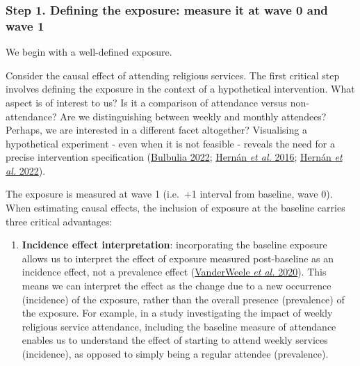 \documentclass[
  singlecolumn]{article}
\providecommand{\tightlist}{%
  \setlength{\itemsep}{0pt}\setlength{\parskip}{0pt}}\usepackage{longtable,booktabs,array}
\begin{document}
\subsubsection{Step 1. Defining the exposure: measure it at wave 0 and
wave
1}\label{step-1.-defining-the-exposure-measure-it-at-wave-0-and-wave-1}

We begin with a well-defined exposure.

Consider the causal effect of attending religious services. The first
critical step involves defining the exposure in the context of a
hypothetical intervention. What aspect is of interest to us? Is it a
comparison of attendance versus non-attendance? Are we distinguishing
between weekly and monthly attendees? Perhaps, we are interested in a
different facet altogether? Visualising a hypothetical experiment - even
when it is not feasible - reveals the need for a precise intervention
specification (\hyperref[ref-bulbulia2022]{Bulbulia 2022};
\hyperref[ref-hernuxe1n2016a]{Hernán \emph{et al.} 2016};
\hyperref[ref-hernuxe1n2022]{Hernán \emph{et al.} 2022}).

The exposure is measured at wave 1 (i.e.~+1 interval from baseline, wave
0). When estimating causal effects, the inclusion of exposure at the
baseline carries three critical advantages:

\begin{enumerate}
\def\labelenumi{\alph{enumi}.}
\tightlist
\item
  \textbf{Incidence effect interpretation}: incorporating the baseline
  exposure allows us to interpret the effect of exposure measured
  post-baseline as an incidence effect, not a prevalence effect
  (\hyperref[ref-vanderweele2020]{VanderWeele \emph{et al.} 2020}). This
  means we can interpret the effect as the change due to a new
  occurrence (incidence) of the exposure, rather than the overall
  presence (prevalence) of the exposure. For example, in a study
  investigating the impact of weekly religious service attendance,
  including the baseline measure of attendance enables us to understand
  the effect of starting to attend weekly services (incidence), as
  opposed to simply being a regular attendee (prevalence).
\end{enumerate}
\end{document}
